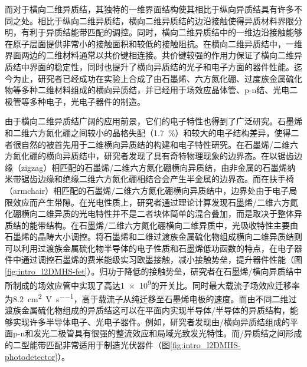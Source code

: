     而对于横向二维异质结，其独特的一维界面结构使其相比于纵向异质结具有许多不同之处。相比于纵向二维异质结，横向二维异质结的边沿接触使得异质材料界限分明，有利于异质结能带匹配的调控。同时，横向二维异质结中的一维边沿接触能够在原子层面提供非常小的接触面积和较低的接触阻抗。在横向二维异质结中，一维界面两边的二维材料通常以共价键相连接。共价键较强的作用力保证了横向二维异质结中界面的稳定性，同时也提升了横向异质结的光子和电子方面的器件性能。迄今为止，研究者已经成功在实验上合成了由石墨烯、六方氮化硼、过度族金属硫化物等多种二维材料组成的横向异质结，并已经用于场效应晶体管、p-n结、光电二极管等多种电子，光电子器件的制造。


    由于横向二维异质结广阔的应用前景，它们的电子特性也得到了广泛研究。石墨烯和二维六方氮化硼之间较小的晶格失配（\SI{1.7}{\percent}）和较大的电子结构差异，使得二者很自然的被首先用于二维横向异质结的构建和电子特性研究。在石墨烯/二维六方氮化硼的横向异质结中，研究者发现了具有奇特物理现象的边界态。在以锯齿边缘（zigzag）相匹配的石墨烯/二维六方氮化硼横向异质结，由非金属的石墨烯纳米带锯齿边缘和绝缘二维六方氮化硼相结合会产生半金属的边界态。而在扶手椅（armchair）相匹配的石墨烯/二维六方氮化硼横向异质结中，边界处由于电子局限效应而产生带隙。在光电性质上，研究者通过理论计算发现石墨烯/二维六方氮化硼横向二维异质的光电特性并不是二者块体简单的混合叠加，而是取决于整体异质结的能带结构。在石墨烯/二维六方氮化硼横向二维异质中，光吸收特性主要由石墨烯的晶畴大小调控。将石墨烯和二维过渡族金属硫化物组成横向二维异质结则可以利用过渡族金属硫化物半导体的电子性质和石墨烯低功函数的特点，在电子器件中通过调控石墨烯的费米能级实习欧墨接触，减小接触势垒，提升器件性能（图\ref{fig:intro_l2DMHS-fet}）。归功于降低的接触势垒，研究者在石墨烯/横向异质结中所制成的场效应管中实现了高达\SI{1e9}{}的开关比。同时最大载流子场效应迁移率为\SI{8.2}{\centi\metre\squared\per\volt\per\second}，高于载流子从纯迁移至石墨烯电极的速度。而由不同二维过渡族金属硫化物组成的异质结这可以在平面内实现半导体/半导体的异质结构，能够实现许多半导体电子、光电子器件。例如，研究者发现由/横向异质结组成的平面p-n和发光二极管具有很强的整流效应和局域光致发光特性。而/异质结之间形成的二型能带匹配非常适用于制造光伏器件（图\ref{fig:intro_l2DMHS-photodetector}）。

